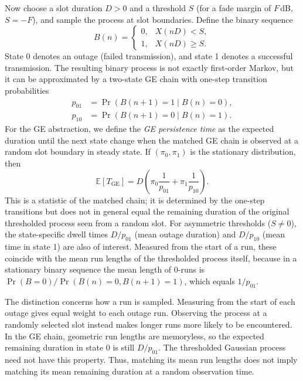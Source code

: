 \documentclass[conference]{IEEEtran}
\newcommand{\ETGE}{\mathbb{E}[T_{\mathrm{GE}}]}
\DeclareMathOperator{\Prob}{Pr}
\begin{document}
Now choose a slot duration $D>0$ and a threshold $S$ (for a fade margin of $F$\,dB, $S=-F$), and sample the process at slot boundaries. Define the binary sequence
\begin{equation}\label{eq:binary}
B(n)=\begin{cases}0, & X(nD)<S,\\ 1, & X(nD)\ge S.\end{cases}
\end{equation}
State 0 denotes an outage (failed transmission), and state 1 denotes a successful transmission. The resulting binary process is not exactly first-order Markov, but it can be approximated by a two-state GE chain with one-step transition probabilities
\begin{align}
p_{01}&=\Prob(B(n{+}1)=1\mid B(n)=0),\nonumber\\
p_{10}&=\Prob(B(n{+}1)=0\mid B(n)=1).\label{eq:pdef}
\end{align}
For the GE abstraction, we define the \emph{GE persistence time} as the expected duration until the next state change when the matched GE chain is observed at a random slot boundary in steady state. If $(\pi_0,\pi_1)$ is the stationary distribution, then
\begin{equation}\label{eq:ETGE}
\ETGE=D\left(\pi_0\frac{1}{p_{01}}+\pi_1\frac{1}{p_{10}}\right).
\end{equation}
This is a statistic of the matched chain; it is determined by the one-step transitions but does not in general equal the remaining duration of the original thresholded process seen from a random slot. For asymmetric thresholds ($S\neq0$), the state-specific dwell times $D/p_{01}$ (mean outage duration) and $D/p_{10}$ (mean time in state 1) are also of interest. Measured from the start of a run, these coincide with the mean run lengths of the thresholded process itself, because in a stationary binary sequence the mean length of 0-runs is $\Prob(B=0)/\Prob(B(n)=0,B(n{+}1)=1)$, which equals $1/p_{01}$.

The distinction concerns how a run is sampled. Measuring from the start of each outage gives equal weight to each outage run. Observing the process at a randomly selected slot instead makes longer runs more likely to be encountered. In the GE chain, geometric run lengths are memoryless, so the expected remaining duration in state 0 is still $D/p_{01}$. The thresholded Gaussian process need not have this property. Thus, matching its mean run lengths does not imply matching its mean remaining duration at a random observation time.
\end{document}
